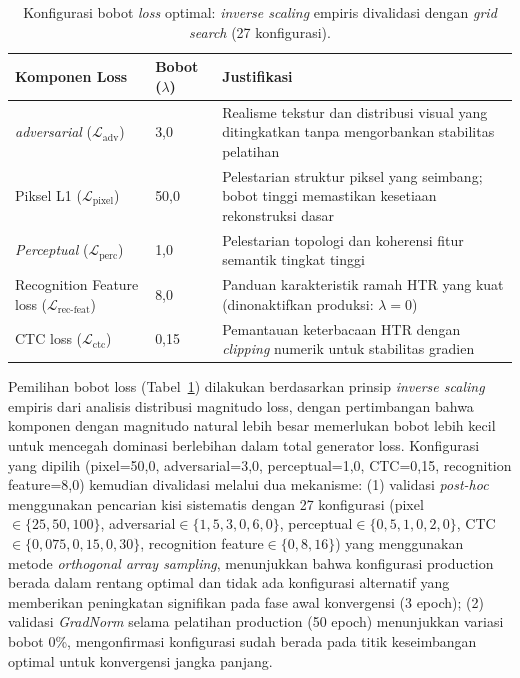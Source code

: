 \begin{table}[H]
  \renewcommand{\arraystretch}{1.3}
  \caption[Konfigurasi bobot \textit{loss} optimal]{Konfigurasi bobot \textit{loss} optimal: \textit{inverse scaling} empiris divalidasi dengan \textit{grid search} (27 konfigurasi).}
  \label{table:optimal_weights}
  \small

  \footnotesize
  \begin{tabular}{|l|p{2.2cm}|p{5.3cm}|}
    \hline
    \textbf{Komponen Loss}                                     & \textbf{Bobot ($\lambda$)} & \textbf{Justifikasi}                                                                             \\
    \hline
    \textit{adversarial} ($\mathcal{L}_{\text{adv}}$)          & 3,0                        & Realisme tekstur dan distribusi visual yang ditingkatkan tanpa mengorbankan stabilitas pelatihan \\
    \hline
    Piksel L1 ($\mathcal{L}_{\text{pixel}}$)                   & 50,0                       & Pelestarian struktur piksel yang seimbang; bobot tinggi memastikan kesetiaan rekonstruksi dasar  \\
    \hline
    \textit{Perceptual} ($\mathcal{L}_{\text{perc}}$)          & 1,0                        & Pelestarian topologi dan koherensi fitur semantik tingkat tinggi                                 \\
    \hline
    Recognition Feature loss ($\mathcal{L}_{\text{rec-feat}}$) & 8,0                        & Panduan karakteristik ramah HTR yang kuat (dinonaktifkan produksi: $\lambda=0$)                  \\
    \hline
    CTC loss ($\mathcal{L}_{\text{ctc}}$)                      & 0,15                       & Pemantauan keterbacaan HTR dengan \textit{clipping} numerik untuk stabilitas gradien             \\
    \hline
  \end{tabular}
\end{table}

Pemilihan bobot loss (Tabel~\ref{table:optimal_weights}) dilakukan berdasarkan prinsip \textit{inverse scaling} empiris dari analisis distribusi magnitudo loss, dengan pertimbangan bahwa komponen dengan magnitudo natural lebih besar memerlukan bobot lebih kecil untuk mencegah dominasi berlebihan dalam total generator loss. Konfigurasi yang dipilih (pixel=50,0, adversarial=3,0, perceptual=1,0, CTC=0,15, recognition feature=8,0) kemudian divalidasi melalui dua mekanisme: (1) validasi \textit{post-hoc} menggunakan pencarian kisi sistematis dengan 27 konfigurasi (pixel$\in\{25,50,100\}$, adversarial$\in\{1,5,3,0,6,0\}$, perceptual$\in\{0,5,1,0,2,0\}$, CTC$\in\{0,075,0,15,0,30\}$, recognition feature$\in\{0,8,16\}$) yang menggunakan metode \textit{orthogonal array sampling}, menunjukkan bahwa konfigurasi production berada dalam rentang optimal dan tidak ada konfigurasi alternatif yang memberikan peningkatan signifikan pada fase awal konvergensi (3 epoch); (2) validasi \textit{GradNorm} selama pelatihan production (50 epoch) menunjukkan variasi bobot 0\%, mengonfirmasi konfigurasi sudah berada pada titik keseimbangan optimal untuk konvergensi jangka panjang.

